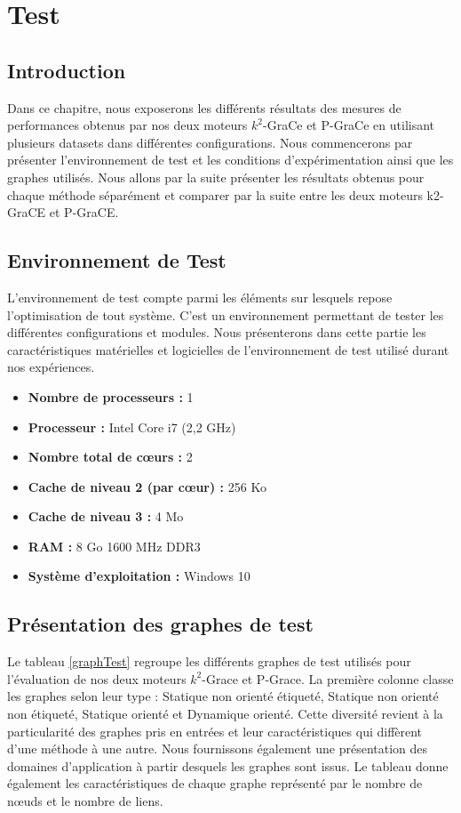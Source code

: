 \chapter{Test}
	\section{Introduction}
	
Dans ce chapitre, nous exposerons les différents résultats des mesures de performances obtenus par nos deux moteurs $k^2$-GraCe et P-GraCe en utilisant plusieurs datasets dans différentes configurations. Nous commencerons par présenter l'environnement de test et les conditions d'expérimentation ainsi que les graphes utilisés. Nous allons par la suite présenter les résultats obtenus pour chaque méthode séparément et comparer par la suite entre les deux moteurs k2-GraCE et P-GraCE. 


	
	
	\section{Environnement de Test}
	L'environnement de test compte parmi les éléments sur lesquels repose l'optimisation de tout système. C'est un environnement permettant de tester les différentes configurations et modules. Nous présenterons dans cette partie les caractéristiques matérielles et logicielles de l'environnement de test utilisé durant nos expériences. 

	
	\begin{itemize}[label=$\bullet$]
		\item \textbf{Nombre de processeurs :}	1
		\item \textbf{Processeur :} Intel Core i7 (2,2 GHz)
  		\item \textbf{Nombre total de cœurs :}	2
  		\item \textbf{Cache de niveau 2 (par cœur) :}	256 Ko
  		\item \textbf{Cache de niveau 3 :}	4 Mo
		\item \textbf{RAM : } 8 Go 1600 MHz DDR3
		\item \textbf{Système d'exploitation : } Windows 10
	\end{itemize}
	\section{Présentation des graphes de test}
	Le tableau \ref{graphTest} regroupe les différents graphes de test utilisés pour l'évaluation de nos deux moteurs $k^2$-Grace et P-Grace. La première colonne classe les graphes selon leur type : Statique non orienté étiqueté, Statique non orienté non étiqueté, Statique  orienté et Dynamique orienté. Cette diversité revient à la particularité des graphes pris en entrées et leur caractéristiques qui diffèrent d'une méthode à une autre.
Nous fournissons également une présentation des domaines d'application à partir desquels  les graphes sont issus. Le tableau donne également les caractéristiques de chaque graphe représenté par le nombre de nœuds et le nombre de liens. 
	 

